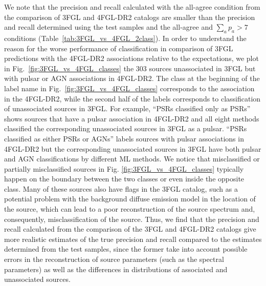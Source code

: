 \documentclass[referee]{aa} %
\newcommand{\dima}[1]{\textcolor{blue}{(Dima: #1)}}
\begin{document}
We note that the precision and recall calculated with the all-agree condition from the comparison of 3FGL and 4FGL-DR2 catalogs are smaller than the precision and recall determined using the test samples and the all-agree and $\sum_a p_a > 7$ conditions (Table~\ref{tab:3FGL_vs_4FGL_2class}).
In order to understand the reason for the worse performance of classification in comparison of 3FGL predictions with the 4FGL-DR2 associations relative to the expectations, we plot in Fig.~\ref{fig:3FGL_vs_4FGL_classes} the 303 sources unassociated in 3FGL but with pulsar or AGN associations in 4FGL-DR2.
The class at the beginning of the label name in Fig.~\ref{fig:3FGL_vs_4FGL_classes} corresponds to the association in the 4FGL-DR2, while the second half of the labels corresponds to classification of unassociated sources in 3FGL. For example, ``PSRs classified only as PSRs'' shows sources that have a pulsar association in 4FGL-DR2 and all eight methods classified the corresponding unassociated sources in 3FGL as a pulsar. ``PSRs classified as either PSRs or AGNs'' labels sources with pulsar associations in 4FGL-DR2 but the corresponding unassociated sources in 3FGL have both pulsar and AGN classifications by different ML methods.
We notice that misclassified or partially misclassified sources in Fig. \ref{fig:3FGL_vs_4FGL_classes} typically happen on the boundary between the two classes or even inside the opposite class.
Many of these sources also have flags in the 3FGL catalog, such as a potential problem with the background diffuse emission model in the location of the source, which can lead to a poor reconstruction of the source spectrum and, consequently, misclassification of the source.
Thus, we find that the precision and recall calculated from the comparison of the 3FGL and 4FGL-DR2 catalogs give more realistic estimates
of the true precision and recall compared to the estimates determined from the test samples, since the former
take into account possible errors in the reconstruction of source parameters (such as the spectral parameters) as well as the differences in distributions of associated and unassociated sources.

%
\end{document}
